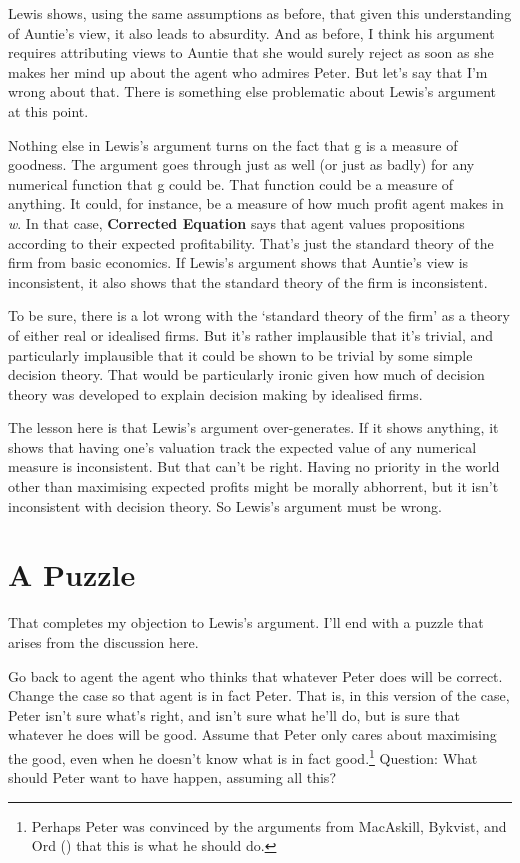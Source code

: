 \documentclass[
  11pt,
  letterpaper,
  DIV=11,
  numbers=noendperiod,
  twoside]{scrartcl}
\begin{document}
Lewis shows, using the same assumptions as before, that given this
understanding of Auntie's view, it also leads to absurdity. And as
before, I think his argument requires attributing views to Auntie that
she would surely reject as soon as she makes her mind up about the agent
who admires Peter. But let's say that I'm wrong about that. There is
something else problematic about Lewis's argument at this point.

Nothing else in Lewis's argument turns on the fact that g is a measure
of goodness. The argument goes through just as well (or just as badly)
for any numerical function that g could be. That function could be a
measure of anything. It could, for instance, be a measure of how much
profit agent makes in \emph{w}. In that case, \textbf{Corrected
Equation} says that agent values propositions according to their
expected profitability. That's just the standard theory of the firm from
basic economics. If Lewis's argument shows that Auntie's view is
inconsistent, it also shows that the standard theory of the firm is
inconsistent.

To be sure, there is a lot wrong with the `standard theory of the firm'
as a theory of either real or idealised firms. But it's rather
implausible that it's trivial, and particularly implausible that it
could be shown to be trivial by some simple decision theory. That would
be particularly ironic given how much of decision theory was developed
to explain decision making by idealised firms.

The lesson here is that Lewis's argument over-generates. If it shows
anything, it shows that having one's valuation track the expected value
of any numerical measure is inconsistent. But that can't be right.
Having no priority in the world other than maximising expected profits
might be morally abhorrent, but it isn't inconsistent with decision
theory. So Lewis's argument must be wrong.

\section{A Puzzle}\label{a-puzzle}

That completes my objection to Lewis's argument. I'll end with a puzzle
that arises from the discussion here.

Go back to agent the agent who thinks that whatever Peter does will be
correct. Change the case so that agent is in fact Peter. That is, in
this version of the case, Peter isn't sure what's right, and isn't sure
what he'll do, but is sure that whatever he does will be good. Assume
that Peter only cares about maximising the good, even when he doesn't
know what is in fact good.\footnote{Perhaps Peter was convinced by the
  arguments from MacAskill, Bykvist, and Ord
  () that this is what he should
  do.} Question: What should Peter want to have happen, assuming all
this?
\end{document}
